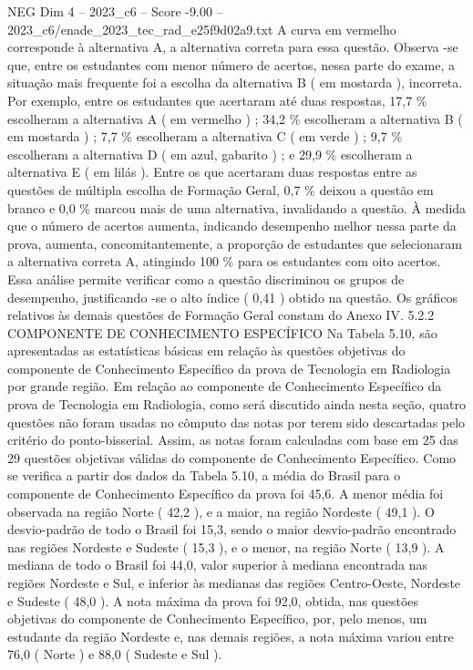 \begin{textsample}{NEG Dim 4 – 2023\_c6 – Score -9.00 – 2023\_c6/enade\_2023\_tec\_rad\_e25f9d02a9.txt}
A curva em vermelho corresponde à alternativa A, a alternativa correta para essa questão.
Observa -se que, entre os estudantes com menor número de acertos, nessa parte do exame, a situação mais frequente foi a escolha da alternativa B ( em mostarda ), incorreta.
Por exemplo, entre os estudantes que acertaram até duas respostas, 17,7 \% escolheram a alternativa A ( em vermelho ) ; 34,2 \% escolheram a alternativa B ( em mostarda ) ; 7,7 \% escolheram a alternativa C ( em verde ) ; 9,7 \% escolheram a alternativa D ( em azul, gabarito ) ; e 29,9 \% escolheram a alternativa E ( em lilás ).
Entre os que acertaram duas respostas entre as questões de múltipla escolha de Formação Geral, 0,7 \% deixou a questão em branco e 0,0 \% marcou mais de uma alternativa, invalidando a questão.
À medida que o número de acertos aumenta, indicando desempenho melhor nessa parte da prova, aumenta, concomitantemente, a proporção de estudantes que selecionaram a alternativa correta A, atingindo 100 \% para os estudantes com oito acertos.
Essa análise permite verificar como a questão discriminou os grupos de desempenho, justificando -se o alto índice ( 0,41 ) obtido na questão.
Os gráficos relativos às demais questões de Formação Geral constam do Anexo IV. 5.2.2 COMPONENTE DE CONHECIMENTO ESPECÍFICO Na Tabela 5.10, são apresentadas as estatísticas básicas em relação às questões objetivas do componente de Conhecimento Específico da prova de Tecnologia em Radiologia por grande região.
Em relação ao componente de Conhecimento Específico da prova de Tecnologia em Radiologia, como será discutido ainda nesta seção, quatro questões não foram usadas no cômputo das notas por terem sido descartadas pelo critério do ponto-bisserial.
Assim, as notas foram calculadas com base em 25 das 29 questões objetivas válidas do componente de Conhecimento Específico.
Como se verifica a partir dos dados da Tabela 5.10, a média do Brasil para o componente de Conhecimento Específico da prova foi 45,6.
A menor média foi observada na região Norte ( 42,2 ), e a maior, na região Nordeste ( 49,1 ).
O desvio-padrão de todo o Brasil foi 15,3, sendo o maior desvio-padrão encontrado nas regiões Nordeste e Sudeste ( 15,3 ), e o menor, na região Norte ( 13,9 ).
A mediana de todo o Brasil foi 44,0, valor superior à mediana encontrada nas regiões Nordeste e Sul, e inferior às medianas das regiões Centro-Oeste, Nordeste e Sudeste ( 48,0 ).
A nota máxima da prova foi 92,0, obtida, nas questões objetivas do componente de Conhecimento Específico, por, pelo menos, um estudante da região Nordeste e, nas demais regiões, a nota máxima variou entre 76,0 ( Norte ) e 88,0 ( Sudeste e Sul ).

\end{textsample}
